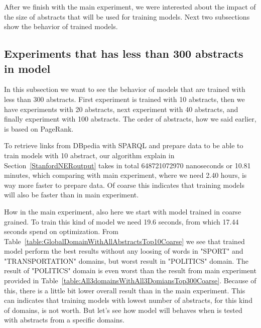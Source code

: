 \documentclass[thesis=M,english]{FITthesis}[2018/05/30]
\begin{document}
	After we finish with the main experiment, we were interested about the impact of the size of abstracts that will be used for training models. Next two subsections show the behavior of trained models.     
\subsection{Experiments that has less than 300 abstracts in model}\label{}
	In this subsection we want to see the behavior of models that are trained with less than 300 abstracts. First experiment is trained with 10 abstracts, then we have experiments with 20 abstracts, next experiment with 40 abstracts, and finally experiment with 100 abstracts. The order of abstracts, how we said earlier, is based on PageRank.
	
	To retrieve links from DBpedia with SPARQL and prepare data to be able to train models with 10 abstract, our algorithm explain in Section~\ref{StanfordNERoutput} takes in total 648721072970 nanoseconds or 10.81 minutes, which comparing with main experiment, where we need 2.40 hours, is way more faster to prepare data. Of coarse this indicates that training models will also be faster than in main experiment.
	
	How in the main experiment, also here we start with model trained in coarse grained. To train this kind of model we need 19.6 seconds, from which 17.44 seconds spend on optimization. From Table~\ref{table:GlobalDomainWithAllAbstractsTop10Coarse} we see that trained model perform the best results without any loosing of words in "SPORT" and "TRANSPORTATION" domains, but worst result in "POLITICS" domain. The result of "POLITICS" domain is even worst than the result from main experiment provided in Table~\ref{table:All3domainsWithAll3DomiansTop300Coarse}. Because of this, there is a little bit lower overall result than in the main experiment. This can indicates that training models with lowest number of abstracts, for this kind of domains, is not worth. But let's see how model will behaves when is tested with abstracts from a specific domains.
	
\end{document}
